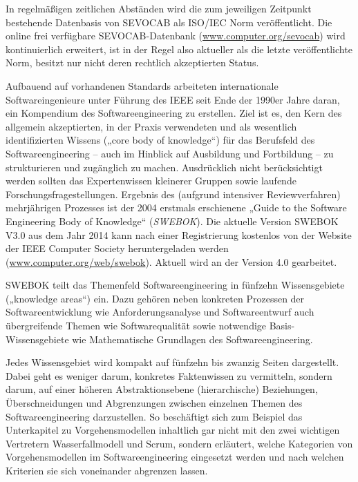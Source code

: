 In regelmäßigen zeitlichen Abständen wird die zum jeweiligen Zeitpunkt bestehende Datenbasis von SEVOCAB als ISO/IEC Norm veröffentlicht. Die online frei verfügbare SEVOCAB-Datenbank (\href{http://www.computer.org/sevocab}{www.computer.org/sevocab}) wird kontinuierlich erweitert, ist in der Regel also aktueller als die letzte veröffentlichte Norm, besitzt nur nicht deren rechtlich akzeptierten Status.

\label{text:SWEBOK}
Aufbauend auf vorhandenen Standards 
arbeiteten internationale Softwareingenieure unter Führung des IEEE seit Ende der 1990er Jahre daran, ein Kompendium des Softwareengineering zu erstellen. Ziel ist es, den Kern des allgemein akzeptierten, in der Praxis verwendeten und als wesentlich identifizierten Wissens („core body of knowledge“) für das Berufsfeld des Softwareengineering – auch im Hinblick auf Ausbildung und Fortbildung – zu strukturieren und zugänglich zu machen. Ausdrücklich nicht berücksichtigt werden sollten das Expertenwissen kleinerer Gruppen sowie laufende Forschungsfragestellungen. Ergebnis des (aufgrund intensiver Reviewverfahren) mehrjährigen Prozesses ist der 2004 erstmals erschienene „Guide to the Software Engineering Body of Knowledge“ (\textit{SWEBOK}). 
Die aktuelle Version SWEBOK V3.0 aus dem Jahr 2014 \cite{swe14} kann nach einer Registrierung kostenlos von der Website der IEEE Computer Society heruntergeladen werden (\href{http://www.computer.org/web/swebok}{www.computer.org/web/swebok}). Aktuell wird an der Version 4.0 gearbeitet. 

SWEBOK teilt das Themenfeld Softwareengineering in fünfzehn Wissensgebiete („knowledge areas“) ein. Dazu gehören neben konkreten Prozessen der Softwareentwicklung wie Anforderungsanalyse und Softwareentwurf auch übergreifende Themen wie Soft\-ware\-qua\-li\-tät sowie notwendige Basis-Wissensgebiete wie Mathematische Grundlagen des Softwareengineering. 

Jedes Wissensgebiet wird kompakt auf fünfzehn bis zwanzig Seiten dargestellt. Dabei geht es weniger darum, konkretes Faktenwissen zu vermitteln, sondern darum, auf einer höheren Abstraktionsebene (hierarchische) Beziehungen, Überschneidungen und Abgrenzungen zwischen einzelnen Themen des Softwareengineering darzustellen. So beschäftigt sich zum Beispiel das Unterkapitel zu Vorgehensmodellen inhaltlich gar nicht mit den zwei wichtigen Vertretern Wasserfallmodell und Scrum, sondern erläutert, welche Kategorien von Vorgehensmodellen im Softwareengineering eingesetzt werden und nach welchen Kriterien sie sich voneinander abgrenzen lassen. 


